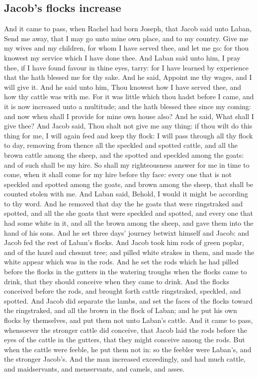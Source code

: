 \begin{biblechapter}
\section*{Jacob's flocks increase}
\verse And it came to pass, when Rachel had born Joseph, that Jacob said unto Laban, Send me away, that I may go unto mine own place, and to my country.
\verse Give me my wives and my children, for whom I have served thee, and let me go: for thou knowest my service which I have done thee.
\verse And Laban said unto him, I pray thee, if I have found favour in thine eyes, tarry: for I have learned by experience that the \LORD hath blessed me for thy sake.
\verse And he said, Appoint me thy wages, and I will give it.
\verse And he said unto him, Thou knowest how I have served thee, and how thy cattle was with me.
\verse For it was little which thou hadst before I came, and it is now increased unto a multitude; and the \LORD hath blessed thee since my coming: and now when shall I provide for mine own house also?
\verse And he said, What shall I give thee? And Jacob said, Thou shalt not give me any thing: if thou wilt do this thing for me, I will again feed and keep thy flock:
\verse I will pass through all thy flock to day, removing from thence all the speckled and spotted cattle, and all the brown cattle among the sheep, and the spotted and speckled among the goats: and of such shall be my hire.
\verse So shall my righteousness answer for me in time to come, when it shall come for my hire before thy face: every one that is not speckled and spotted among the goats, and brown among the sheep, that shall be counted stolen with me.
\verse And Laban said, Behold, I would it might be according to thy word.
\verse And he removed that day the he goats that were ringstraked and spotted, and all the she goats that were speckled and spotted, and every one that had some white in it, and all the brown among the sheep, and gave them into the hand of his sons.
\verse And he set three days' journey betwixt himself and Jacob: and Jacob fed the rest of Laban's flocks.
\verse And Jacob took him rods of green poplar, and of the hazel and chesnut tree; and pilled white strakes in them, and made the white appear which was in the rods.
\verse And he set the rods which he had pilled before the flocks in the gutters in the watering troughs when the flocks came to drink, that they should conceive when they came to drink.
\verse And the flocks conceived before the rods, and brought forth cattle ringstraked, speckled, and spotted.
\verse And Jacob did separate the lambs, and set the faces of the flocks toward the ringstraked, and all the brown in the flock of Laban; and he put his own flocks by themselves, and put them not unto Laban's cattle.
\verse And it came to pass, whensoever the stronger cattle did conceive, that Jacob laid the rods before the eyes of the cattle in the gutters, that they might conceive among the rods.
\verse But when the cattle were feeble, he put them not in: so the feebler were Laban's, and the stronger Jacob's.
\verse And the man increased exceedingly, and had much cattle, and maidservants, and menservants, and camels, and asses.
\end{biblechapter}

